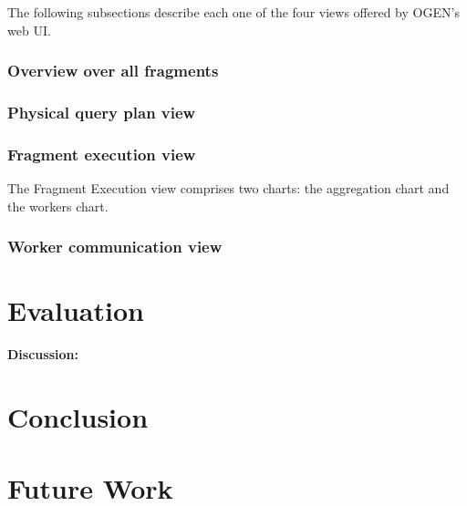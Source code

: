 \documentclass{chi2009}
\newcommand*{\system}{OGEN\xspace}
\newcommand*{\fragment}{Fragment Execution\xspace}
\begin{document}
The following subsections describe each one of the four views offered by \system's web UI.




\subsubsection{Overview over all fragments}
\label{sec:fragments}



\subsubsection{Physical query plan view}


\subsubsection{Fragment execution view}


The \fragment view comprises two charts: the aggregation chart and the workers chart.


  



\subsubsection{Worker communication view}


\section{Evaluation}



\textbf{Discussion:}

\section{Conclusion}


\section{Future Work}




\end{document}
